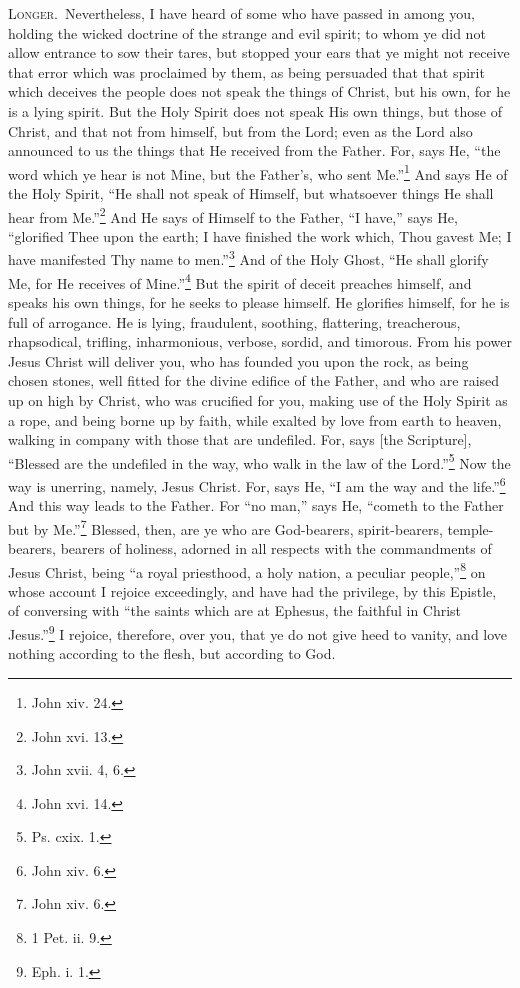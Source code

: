 \textsc{Longer.}~Nevertheless, I have heard of some who have passed in among you, holding the wicked doctrine of the strange and evil spirit; to whom ye did not allow entrance to sow their tares, but stopped your ears that ye might not receive that error which was proclaimed by them, as being persuaded that that spirit which deceives the people does not speak the things of Christ, but his own, for he is a lying spirit. But the Holy Spirit does not speak His own things, but those of Christ, and that not from himself, but from the Lord; even as the Lord also announced to us the things that He received from the Father. For, says He, “the word which ye hear is not Mine, but the Father’s, who sent Me.”\footnote{John xiv. 24.} And says He of the Holy Spirit, “He shall not speak of Himself, but whatsoever things He shall hear from Me.”\footnote{John xvi. 13.} And He says of Himself to the Father, “I have,” says He, “glorified Thee upon the earth; I have finished the work which, Thou gavest Me; I have manifested Thy name to men.”\footnote{John xvii. 4, 6.} And of the Holy Ghost, “He shall glorify Me, for He receives of Mine.”\footnote{John xvi. 14.} But the spirit of deceit preaches himself, and speaks his own things, for he seeks to please himself. He glorifies himself, for he is full of arrogance. He is lying, fraudulent, soothing, flattering, treacherous, rhapsodical, trifling, inharmonious, verbose, sordid, and timorous. From his power Jesus Christ will deliver you, who has founded you upon the rock, as being chosen stones, well fitted for the divine edifice of the Father, and who are raised up on high by Christ, who was crucified for you, making use of the Holy Spirit as a rope, and being borne up by faith, while exalted by love from earth to heaven, walking in company with those that are undefiled. For, says [the Scripture], “Blessed are the undefiled in the way, who walk in the law of the Lord.”\footnote{Ps. cxix. 1.} Now the way is unerring, namely, Jesus Christ. For, says He, “I am the way and the life.”\footnote{John xiv. 6.} And this way leads to the Father. For “no man,” says He, “cometh to the Father but by Me.”\footnote{John xiv. 6.} Blessed, then, are ye who are God-bearers, spirit-bearers, temple-bearers, bearers of holiness, adorned in all respects with the commandments of Jesus Christ, being “a royal priesthood, a holy nation, a peculiar people,”\footnote{1 Pet. ii. 9.} on whose account I rejoice exceedingly, and have had the privilege, by this Epistle, of conversing with “the saints which are at Ephesus, the faithful in Christ Jesus.”\footnote{Eph. i. 1.} I rejoice, therefore, over you, that ye do not give heed to vanity, and love nothing according to the flesh, but according to God.

